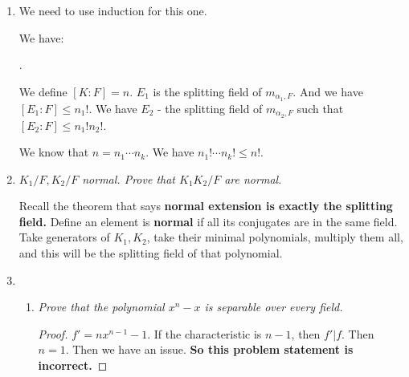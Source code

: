 \documentclass[9pt,reqno,twoside]{amsbook}
\theoremstyle{plain}
\numberwithin{section}{chapter}
\numberwithin{equation}{chapter}
\theoremstyle{definition}
\theoremstyle{remark}
\theoremstyle{plain}
\newcommand{\counter}{\setcounter}
\renewcommand{\leq}{\leqslant}
\begin{document}
\begin{enumerate}[label=\arabic*.]
\item We need to use induction for this one. 

We have: 
\begin{center}
.
\end{center}




We define $[K:F] = n$. $E_1$ is the splitting field of $m_{\alpha_1,F}$. And we have $[E_1:F] \leq n_1!$. We have $E_2$  - the splitting field of $m_{\alpha_2,F}$ such that $[E_2:F] \leq n_1!n_2!$. 

We know that $n = n_1\cdots n_k$. We have $n_1!\cdots n_k! \leq n!$. 

\counter{enumi}{19}

\item \textit{$K_1/F,K_2/F$ normal. Prove that $K_1K_2/F$ are normal. }

Recall the theorem that says \textbf{normal extension is exactly the splitting field. } Define an element is \textbf{normal} if all its conjugates are in the same field. Take generators of $K_1,K_2$, take their minimal polynomials, multiply them all, and this will be the splitting field of that polynomial. 

\counter{enumi}{21}

\item 

\begin{enumerate}
\item \textit{Prove that the polynomial $x^n - x$ is separable over every field. }

\begin{proof}
$f' = nx^{n - 1} - 1$. If the characteristic is $n - 1$, then $f'|f$. Then $n = 1$. Then we have an issue. \textbf{So this problem statement is incorrect. }
\end{proof}
\end{enumerate}




















\end{enumerate}
\end{document}

